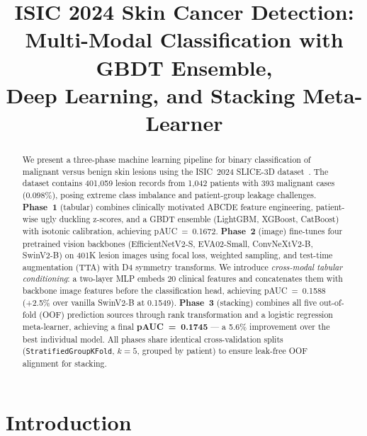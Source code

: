 \documentclass[conference]{IEEEtran}
\begin{document}
\title{ISIC 2024 Skin Cancer Detection:\\
Multi-Modal Classification with GBDT Ensemble,\\
Deep Learning, and Stacking Meta-Learner}

\author{
  \and
}

\maketitle

\begin{abstract}
We present a three-phase machine learning pipeline for binary
classification of malignant versus benign skin lesions using the
ISIC~2024 SLICE-3D dataset~\cite{isic2024}.
The dataset contains 401,059 lesion records from 1,042 patients with
393 malignant cases (0.098\%), posing extreme class imbalance and
patient-group leakage challenges.
\textbf{Phase~1} (tabular) combines clinically motivated ABCDE feature
engineering, patient-wise ugly duckling z-scores, and a GBDT ensemble
(LightGBM, XGBoost, CatBoost) with isotonic calibration, achieving
pAUC~=~0.1672.
\textbf{Phase~2} (image) fine-tunes four pretrained vision backbones
(EfficientNetV2-S, EVA02-Small, ConvNeXtV2-B, SwinV2-B) on 401K lesion
images using focal loss, weighted sampling, and test-time augmentation
(TTA) with D4 symmetry transforms.
We introduce \emph{cross-modal tabular conditioning}: a two-layer MLP
embeds 20 clinical features and concatenates them with backbone image
features before the classification head, achieving pAUC~=~0.1588
(+2.5\% over vanilla SwinV2-B at 0.1549).
\textbf{Phase~3} (stacking) combines all five out-of-fold (OOF)
prediction sources through rank transformation and a logistic regression
meta-learner, achieving a final \textbf{pAUC~=~0.1745} ---
a 5.6\% improvement over the best individual model.
All phases share identical cross-validation splits
(\texttt{StratifiedGroupKFold}, $k{=}5$, grouped by patient) to ensure
leak-free OOF alignment for stacking.
\end{abstract}

\section{Introduction}
\end{document}
